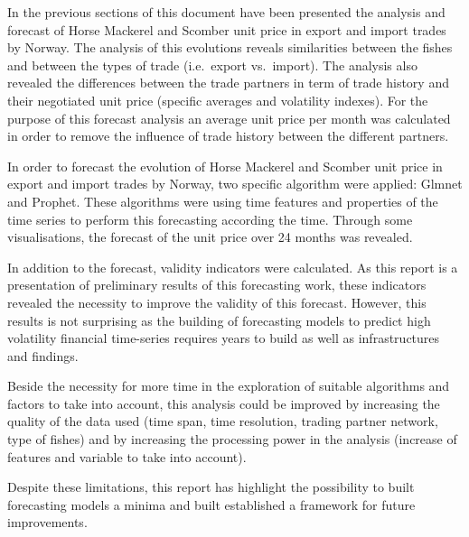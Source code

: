 \documentclass[10,a4paperpaper,]{article}
\begin{document}
In the previous sections of this document have been presented the
analysis and forecast of Horse Mackerel and Scomber unit price in export
and import trades by Norway. The analysis of this evolutions reveals
similarities between the fishes and between the types of trade
(i.e.~export vs.~import). The analysis also revealed the differences
between the trade partners in term of trade history and their negotiated
unit price (specific averages and volatility indexes). For the purpose
of this forecast analysis an average unit price per month was calculated
in order to remove the influence of trade history between the different
partners.

In order to forecast the evolution of Horse Mackerel and Scomber unit
price in export and import trades by Norway, two specific algorithm were
applied: Glmnet and Prophet. These algorithms were using time features
and properties of the time series to perform this forecasting according
the time. Through some visualisations, the forecast of the unit price
over 24 months was revealed.

In addition to the forecast, validity indicators were calculated. As
this report is a presentation of preliminary results of this forecasting
work, these indicators revealed the necessity to improve the validity of
this forecast. However, this results is not surprising as the building
of forecasting models to predict high volatility financial time-series
requires years to build as well as infrastructures and findings.

Beside the necessity for more time in the exploration of suitable
algorithms and factors to take into account, this analysis could be
improved by increasing the quality of the data used (time span, time
resolution, trading partner network, type of fishes) and by increasing
the processing power in the analysis (increase of features and variable
to take into account).

Despite these limitations, this report has highlight the possibility to
built forecasting models a minima and built established a framework for
future improvements.
\end{document}
